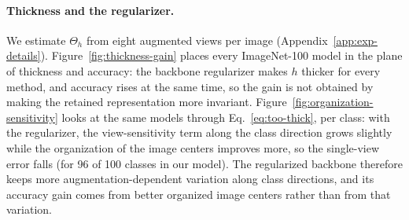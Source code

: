\documentclass{article} %
\theoremstyle{remark}
\begin{document}
\paragraph{Thickness and the regularizer.}
We estimate $\Theta_h$ from eight augmented views per image (Appendix~\ref{app:exp-details}). Figure~\ref{fig:thickness-gain} places every ImageNet-100 model in the plane of thickness and accuracy: the backbone regularizer makes $h$ thicker for every method, and accuracy rises at the same time, so the gain is not obtained by making the retained representation more invariant. Figure~\ref{fig:organization-sensitivity} looks at the same models through Eq.~\eqref{eq:too-thick}, per class: with the regularizer, the view-sensitivity term along the class direction grows slightly while the organization of the image centers improves more, so the single-view error falls (for 96 of 100 classes in our model). The regularized backbone therefore keeps more augmentation-dependent variation along class directions, and its accuracy gain comes from better organized image centers rather than from that variation.






\end{document}
